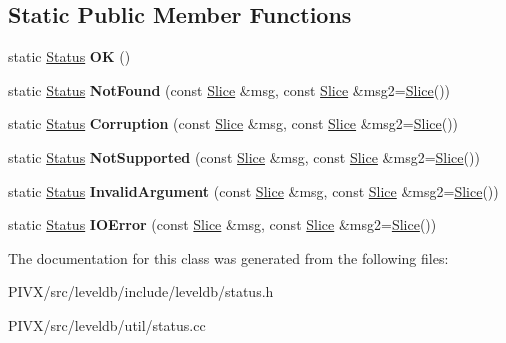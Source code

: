 \subsection*{Static Public Member Functions}
\begin{DoxyCompactItemize}
\item 
\mbox{\label{classleveldb_1_1_status_a8e3720d233281c874a53c17e081f51b3}} 
static \mbox{\hyperlink{classleveldb_1_1_status}{Status}} {\bfseries OK} ()
\item 
\mbox{\label{classleveldb_1_1_status_a9e5beb5b2e758f041e0c012426e7b1b8}} 
static \mbox{\hyperlink{classleveldb_1_1_status}{Status}} {\bfseries Not\+Found} (const \mbox{\hyperlink{classleveldb_1_1_slice}{Slice}} \&msg, const \mbox{\hyperlink{classleveldb_1_1_slice}{Slice}} \&msg2=\mbox{\hyperlink{classleveldb_1_1_slice}{Slice}}())
\item 
\mbox{\label{classleveldb_1_1_status_a755b1ee5b0029cf9ea1128f1cdff5855}} 
static \mbox{\hyperlink{classleveldb_1_1_status}{Status}} {\bfseries Corruption} (const \mbox{\hyperlink{classleveldb_1_1_slice}{Slice}} \&msg, const \mbox{\hyperlink{classleveldb_1_1_slice}{Slice}} \&msg2=\mbox{\hyperlink{classleveldb_1_1_slice}{Slice}}())
\item 
\mbox{\label{classleveldb_1_1_status_a66c6b7171cedb55651e34e5df9a14705}} 
static \mbox{\hyperlink{classleveldb_1_1_status}{Status}} {\bfseries Not\+Supported} (const \mbox{\hyperlink{classleveldb_1_1_slice}{Slice}} \&msg, const \mbox{\hyperlink{classleveldb_1_1_slice}{Slice}} \&msg2=\mbox{\hyperlink{classleveldb_1_1_slice}{Slice}}())
\item 
\mbox{\label{classleveldb_1_1_status_aefef9f88d0a6ca6d34bd9dec1670309e}} 
static \mbox{\hyperlink{classleveldb_1_1_status}{Status}} {\bfseries Invalid\+Argument} (const \mbox{\hyperlink{classleveldb_1_1_slice}{Slice}} \&msg, const \mbox{\hyperlink{classleveldb_1_1_slice}{Slice}} \&msg2=\mbox{\hyperlink{classleveldb_1_1_slice}{Slice}}())
\item 
\mbox{\label{classleveldb_1_1_status_ada6143081d41803808f77287153f96b7}} 
static \mbox{\hyperlink{classleveldb_1_1_status}{Status}} {\bfseries I\+O\+Error} (const \mbox{\hyperlink{classleveldb_1_1_slice}{Slice}} \&msg, const \mbox{\hyperlink{classleveldb_1_1_slice}{Slice}} \&msg2=\mbox{\hyperlink{classleveldb_1_1_slice}{Slice}}())
\end{DoxyCompactItemize}


The documentation for this class was generated from the following files\+:\begin{DoxyCompactItemize}
\item 
P\+I\+V\+X/src/leveldb/include/leveldb/status.\+h\item 
P\+I\+V\+X/src/leveldb/util/status.\+cc\end{DoxyCompactItemize}
